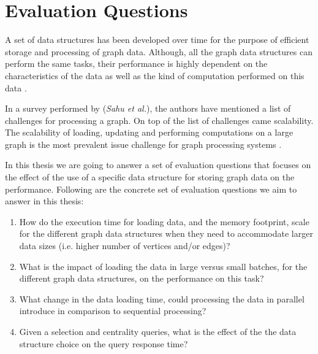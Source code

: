 {\section{Evaluation Questions}
\label{sec:EvalQuests}

A set of data structures has been developed over time for the purpose of efficient storage and processing of graph data. Although, all the graph data structures can perform the same tasks, their performance is highly dependent on the characteristics of the data as well as the kind of computation performed on this data \cite{Paradies2017}.

In a survey performed by (\textit{Sahu et al.}), the authors have mentioned a list of challenges for processing a graph. On top of the list of challenges came scalability. The scalability of loading, updating and performing computations on a large graph is the most prevalent issue challenge for graph processing systems \cite{sahu2017ubiquity}.

In this thesis we are going to answer a set of evaluation questions that focuses on the effect of the use of a specific data structure for storing graph data on the performance. Following are the concrete set of evaluation questions we aim to answer in this thesis:

\begin{enumerate}
\item How do the execution time for loading data, and the memory footprint, scale for the different graph data structures when they need to accommodate larger data sizes (i.e. higher number of vertices and/or edges)? 
\item What is the impact of loading the data in large versus small batches, for the different graph data structures, on the performance on this task?
\item What change in the data loading time, could processing the data in parallel introduce in comparison to sequential processing?
\item Given a selection and centrality queries, what is the effect of the the data structure choice on the query response time?%


\end{enumerate}}
